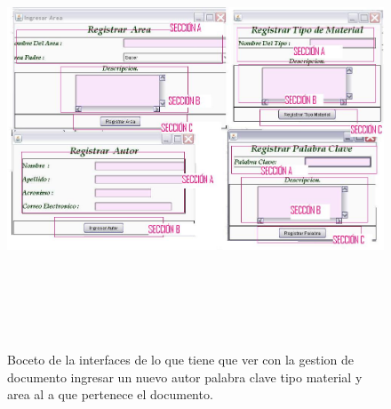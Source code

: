 \documentclass[]{article}
\begin{document}
\begin{figure}[h]
\includegraphics[width= 18cm , height= 13cm]{Bocetos/gestionDocumento.JPG}
\caption{Boceto de la interfaces de lo que tiene que ver con la gestion de documento ingresar un nuevo autor palabra clave tipo material y area al a que pertenece el documento. }
\end{figure}
\end{document}
